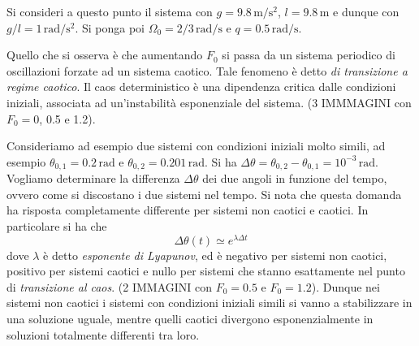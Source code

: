 Si consideri a questo punto il sistema con $g = 9.8 \, \mathrm{m/s^2}$, $l = 9.8 \, \mathrm{m}$ e dunque con $g/l = 1 \, \mathrm{rad/s^2}$. Si ponga poi $\Omega_0 = 2/3 \, \mathrm{rad/s}$ e $q = 0.5 \, \mathrm{rad/s}$.

Quello che si osserva è che aumentando $F_0$ si passa da un sistema periodico di oscillazioni forzate ad un sistema caotico. Tale fenomeno è detto \emph{di transizione a regime caotico}. Il caos deterministico è una dipendenza critica dalle condizioni iniziali, associata ad un'instabilità esponenziale del sistema. (3 IMMMAGINI con $F_0 = 0$, 0.5 e 1.2).

Consideriamo ad esempio due sistemi con condizioni iniziali molto simili, ad esempio $\theta_{0,1} = 0.2 \, \mathrm{rad}$ e $\theta_{0,2} = 0.201 \, \mathrm{rad}$. Si ha $\Delta \theta = \theta_{0,2} - \theta_{0,1} = 10^{-3} \, \mathrm{rad}$. Vogliamo determinare la differenza $\Delta \theta$ dei due angoli in funzione del tempo, ovvero come si discostano i due sistemi nel tempo. Si nota che questa domanda ha risposta completamente differente per sistemi non caotici e caotici. In particolare si ha che
\[
\Delta \theta (t) \simeq e^{\lambda \Delta t}
\]
dove $\lambda$ è detto \emph{esponente di Lyapunov}, ed è negativo per sistemi non caotici, positivo per sistemi caotici e nullo per sistemi che stanno esattamente nel punto di \emph{transizione al caos}. (2 IMMAGINI con $F_0 = 0.5$ e $F_0 = 1.2$). Dunque nei sistemi non caotici i sistemi con condizioni iniziali simili si vanno a stabilizzare in una soluzione uguale, mentre quelli caotici divergono esponenzialmente in soluzioni totalmente differenti tra loro.
